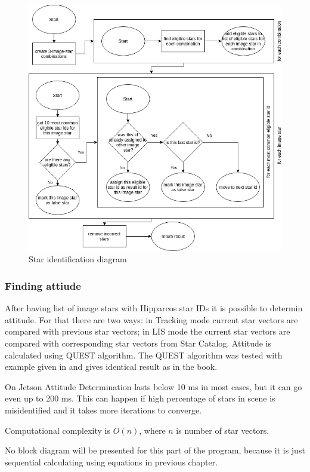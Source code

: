 \documentclass[12pt,a4paper,twoside]{article}
\begin{document}
\begin{figure}[!htbp]
\includegraphics[scale=0.55]{star_identifier_diagram.jpg}
\centering
\caption{Star identification diagram}
\label{fig:star_identifier_diagram}
\end{figure}


\subsubsection{Finding attiude}
After having list of image stars with Hipparcos star IDs it is possible to determin attitude. For that there are two ways: in Tracking mode current star vectors are compared with previous star vectors; in LIS mode the current star vectors are compared with corresponding star vectors from Star Catalog. Attitude is calculated using QUEST algorithm. The QUEST algorithm was tested with example given in \cite{hall2003spacecraft} and gives identical result as in the book.

On Jetson Attitude Determination lasts below 10 ms in most cases, but it can go even up to 200 ms. This can happen if high percentage of stars in scene is misidentified and it takes more iterations to converge.

Computational complexity is $O(n)$, where $n$ is number of star vectors.

No block diagram will be presented for this part of the program, because it is just sequential calculating using equations in previous chapter.
\end{document}
